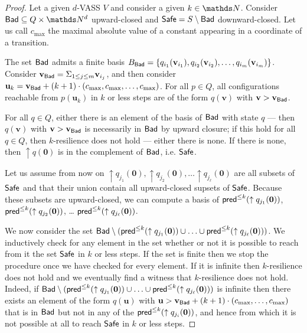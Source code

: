 \begin{proof}
Let a given $d$-VASS $V$ and consider a given $k \in \N$.
Consider $\Bad \subseteq Q \times \N^d$ upward-closed and 
$\textsf{Safe} = S \setminus \textsf{Bad}$
 downward-closed.
Let us call $c_{\max}$ the maximal absolute value of a constant appearing in a coordinate of a transition.

The set $\textsf{Bad}$ admits a finite basis 
$B_{\textsf{Bad}} = \{ q_{i_1}(\textbf{v}_{i_1}), q_{i_2}(\textbf{v}_{i_2}), \ldots,
q_{i_m}(\textbf{v}_{i_m}) \}$.
Consider $\textbf{v}_{\textsf{Bad}} = \Sigma_{1 \leq j \leq m} \textbf{v}_{i_j}$,
and then consider 
$\textbf{u}_k = \textbf{v}_{\textsf{Bad}} + (k+1) \cdot (c_{\max}, c_{\max}, \ldots, c_{\max})$.
For all $p \in Q$, all configurations reachable from $p(\textbf{u}_k)$ in $k$ or less steps are 
of the form $q(\textbf{v})$ with $ \textbf{v} > \textbf{v}_{\textsf{Bad}}$.

For all $q \in Q$, either there is an element of the basis of $\textsf{Bad}$ with state $q$ \----
then $q(\textbf{v})$ with $\textbf{v} > \textbf{v}_{\textsf{Bad}}$ is necessarily in $\textsf{Bad}$ by upward closure; if this hold for all $q \in Q$, then $k$-resilience does not hold \---- either there is none. If there is none, then 
$\uparrow q(\textbf{0})$
 is in the complement of $\textsf{Bad}$, i.e. $\textsf{Safe}$.

Let us assume from now on 
 $\uparrow q_{j_1}(\textbf{0}), \uparrow q_{j_2}(\textbf{0}), \ldots \uparrow q_{j_\ell}(\textbf{0})$ are
all subsets of $\textsf{Safe}$ and that their union contain all upward-closed supsets of $\textsf{Safe}$.
Because these subsets are upward-closed, we can compute a basis of
$\textsf{pred}^{\leq k}(\uparrow q_{j_1}(\textbf{0}))$, $\textsf{pred}^{\leq k}(\uparrow q_{j_2}(\textbf{0}))$, \ldots
$\textsf{pred}^{\leq k}(\uparrow q_{j_\ell}(\textbf{0}))$.


We now consider the set 
$\textsf{Bad} \setminus (\textsf{pred}^{\leq k}(\uparrow q_{j_1}(\textbf{0})) \cup \ldots \cup \textsf{pred}^{\leq k}(\uparrow q_{j_\ell}(\textbf{0})) )$.
We inductively check for any element in the set whether or not it is possible to reach from it the set $\textsf{Safe}$ in $k$ or less steps.
If the set is finite then we stop the procedure once we have checked for every element.
If it is infinite then
$k$-resilience does not hold 
and we eventually find a witness that $k$-resilience does not hold.
Indeed, 
if
$\textsf{Bad} \setminus (\textsf{pred}^{\leq k}(\uparrow q_{j_1}(\textbf{0})) \cup \ldots \cup \textsf{pred}^{\leq k}(\uparrow q_{j_\ell}(\textbf{0})) )$
is
infinite
then
there exists an element of the form $q(\textbf{u} )$
with $\textbf{u} > \textbf{v}_{\textsf{Bad}} + (k+1) \cdot (c_{\max}, \ldots, c_{\max})$ 
that is in $\textsf{Bad}$ but not in any of the $\textsf{pred}^{\leq k}(\uparrow q_{j_i}(\textbf{0}))$,
and hence from which it is not possible at all to reach
$\textsf{Safe}$ in $k$ or less steps.
\end{proof}


